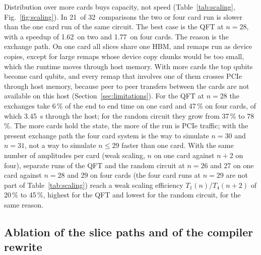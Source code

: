 \documentclass[pdflatex,sn-mathphys-num]{sn-jnl}
\newcommand{\NumQftTwentyEightSpeedupTwo}{1.62}
\newcommand{\NumScaleBelowOne}{21}
\newcommand{\NumScaleBestFour}{1.77}
\newcommand{\NumScaleBestFourN}{28}
\newcommand{\NumScaleCases}{32}
\newcommand{\NumScaleExchHostQftFour}{3.45}
\newcommand{\NumScaleExchQftFour}{47}
\newcommand{\NumScaleExchQftOne}{6}
\newcommand{\NumScaleExchRandFour}{78}
\newcommand{\NumScaleExchRandOne}{37}
\newcommand{\NumWeakEffFourMax}{45}
\newcommand{\NumWeakEffFourMin}{20}
\theoremstyle{thmstyleone}
\theoremstyle{thmstylethree}
\begin{document}
Distribution over more cards buys capacity, not speed (Table~\ref{tab:scaling}, Fig.~\ref{fig:scaling}). In
\NumScaleBelowOne~of \NumScaleCases~comparisons the two or four card run is slower than the one card run of the same
circuit. The best case is the QFT at $n=\NumScaleBestFourN$, with a speedup of \NumQftTwentyEightSpeedupTwo~on two and
\NumScaleBestFour~on four cards. The reason is the exchange path. On one card all slices share one HBM, and remaps run as
device copies, except for large remaps whose device copy chunks would be too small, which the runtime moves through host
memory. With more cards the top qubits become card qubits, and every remap that involves one of them crosses PCIe through
host memory, because peer to peer transfers between the cards are not available on this host
(Section~\ref{sec:limitations}). For the QFT at $n=28$ the exchanges take \NumScaleExchQftOne\,\% of the end to end
time on one card and \NumScaleExchQftFour\,\% on four cards, of which \NumScaleExchHostQftFour~s through the host; for the
random circuit they grow from \NumScaleExchRandOne\,\% to \NumScaleExchRandFour\,\%. The more cards hold the state,
the more of the run is PCIe traffic; with the present exchange path the four card system is the way to simulate
$n=30$ and $n=31$, not a way to simulate $n\le 29$ faster than one card. With the same number of amplitudes per card (weak scaling, $n$ on one card against $n+2$ on four), separate runs
of the QFT and the random circuit at $n=26$ and 27 on one card against $n=28$ and 29 on four cards (the four card runs
at $n=29$ are not part of Table~\ref{tab:scaling}) reach a weak scaling efficiency $T_1(n)/T_4(n+2)$ of
\NumWeakEffFourMin\,\% to \NumWeakEffFourMax\,\%, highest for the QFT and lowest for the random circuit, for the same
reason.

\subsection{Ablation of the slice paths and of the compiler rewrite}\label{subsec:res-ablation}
\end{document}
